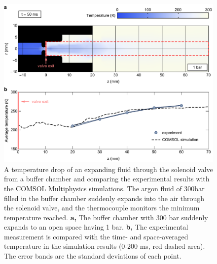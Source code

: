 \begin{figure}[t!]
\centering
\includegraphics[width=130mm]{figures/ch2/comsol/comsolSolenoid.pdf}
\caption{A temperature drop of an expanding fluid through the solenoid valve from a buffer chamber and comparing the experimental results with the COMSOL Multiphysics simulations. The argon fluid of $300 \text {bar}$ filled in the buffer chamber suddenly expands into the air through the solenoid valve, and the thermocouple monitors the minimum temperature reached. \textbf{a,} The buffer chamber with 300 bar suddenly expands to an open space having 1 bar. \textbf{b,} The experimental measurement is compared with the time- and space-averaged temperature in the simulation results (0-200 ms, red dashed area). The error bands are the standard deviations of each point.}
\label{fig:comsolSolenoid}
\end{figure}

